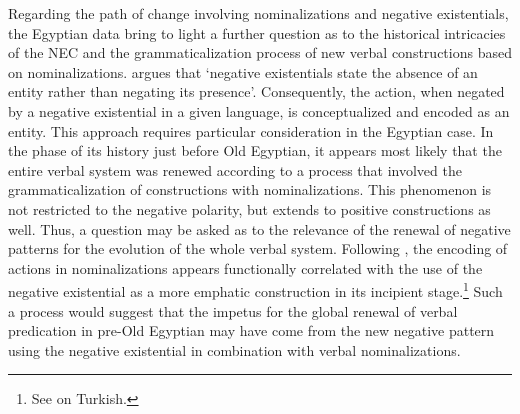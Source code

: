 \documentclass[output=paper]{langsci/langscibook}
\newcommand{\ꜥ}{ʿ}
\newcommand{\ꜣ}{\kern-.25pt\texttt{ꜣ}\kern-.6pt}
\begin{document}
Regarding the path of change involving nominalizations and negative existentials, the Egyptian data bring to light a further question as to the historical intricacies of the NEC and the grammaticalization process of new verbal constructions based on nominalizations. \citet[139]{Veselinova2013} argues that ‘negative existentials state the absence of an entity rather than negating its presence’. Consequently, the action, when negated by a negative existential in a given language, is conceptualized and encoded as an entity. This approach requires particular consideration in the Egyptian case. In the phase of its history just before Old Egyptian, it appears most likely that the entire verbal system was renewed according to a process that involved the grammaticalization of constructions with nominalizations. This phenomenon is not restricted to the negative polarity, but extends to positive constructions as well. Thus, a question may be asked as to the relevance of the renewal of negative patterns for the evolution of the whole verbal system. Following \citet{Veselinova2016}, the encoding of actions in nominalizations appears functionally correlated with the use of the negative existential as a more emphatic construction in its incipient stage.\footnote{See \citet[160]{Veselinova2016} on Turkish.}
Such a process would suggest that the impetus for the global renewal of verbal predication in pre-Old Egyptian may have come from the new negative pattern using the negative existential in combination with verbal nominalizations. 
 
\end{document}
